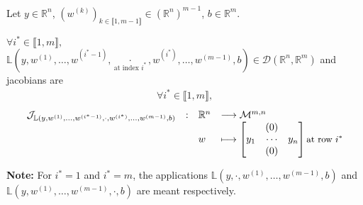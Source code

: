\documentclass[11pt,en]{elegantpaper}
\newcommand{\Real}{\mathbb{R}}
\begin{document}
\begin{proposition}
  {\normalfont
    Let $y \in \Real^n$, $(w^{(k)})_{k \in \llbracket 1,m-1 \rrbracket} \in (\Real^n)^{m-1}$, $b \in \Real^m$. \par
    $\forall i^* \in \llbracket 1,m \rrbracket,$
    $\mathbb{L}(y,w^{(1)},\ldots,w^{(i^*-1)},\underset{\text{at index $i^*$}}{\cdot},w^{(i^*)},\ldots,w^{(m-1)},b) \in \mathcal{D}(\Real^n, \Real^m)$
    and jacobians are \begin{equation*}
      \begin{gathered}
        \forall i^* \in \llbracket 1,m \rrbracket,
      \end{gathered}
    \end{equation*}
    \begin{equation} \label{prop:densel_W_differential}
      \begin{array}{llll}
        \mathcal{J}_{\mathbb{L}(y,w^{(1)},\ldots,w^{(i^*-1)},\cdot,w^{(i^*)},\ldots,w^{(m-1)},b)} & : & \Real^n  & \longrightarrow \mathcal{M}^{m,n} \\
        &   & w & \longmapsto \begin{bmatrix}
          & (0) & \\
          y_1 & \cdots & y_n \\
          & (0) &
        \end{bmatrix} \text{\small{at row $i^*$}}
      \end{array}
    \end{equation} \par
    \textbf{Note:} For $i^*=1$ and $i^*=m$,
    the applications $\mathbb{L}(y,\cdot,w^{(1)},\ldots,w^{(m-1)},b)$ and $\mathbb{L}(y,w^{(1)},\ldots,w^{(m-1)},\cdot,b)$ are meant respectively.
  }
\end{proposition}
\end{document}
